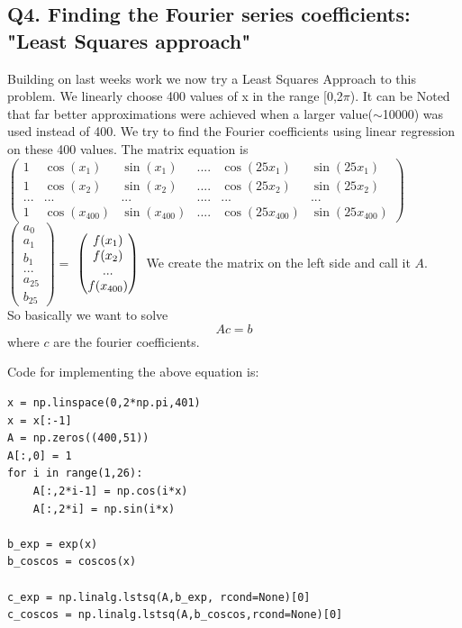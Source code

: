 \documentclass{article}
\begin{document}
\subsection*{Q4. Finding the Fourier series coefficients: "Least Squares approach"}
Building on last weeks work we now try a Least Squares Approach to this problem. We linearly choose 400 values of x in the range [0,2$\pi$). It can be Noted that far better approximations were achieved when a larger value($\sim$10000) was used instead of 400. 
We try to find the Fourier coefficients using linear regression on these 400 values. The matrix equation is\\[5mm]
\vspace{4mm}
$\begin{pmatrix} 
1 & \cos(x_1) & \sin(x_1) & .... & \cos(25x_1) & \sin(25x_1)\\
1 & \cos(x_2) & \sin(x_2) & .... & \cos(25x_2) & \sin(25x_2)\\
... & ... & ... & .... & ... & ... \\
1 & \cos(x_{400}) & \sin(x_{400}) & .... & \cos(25x_{400}) & \sin(25x_{400})
\end{pmatrix}
$$
\begin{pmatrix} 
a_0\\
a_1\\
b_1\\
...\\
a_{25}\\
b_{25}
\end{pmatrix}
=$
$
\begin{pmatrix} 
f(x_1)\\
f(x_2)\\
...\\
f(x_{400})
\end{pmatrix}\\
$
\vspace{4mm}
We create the matrix on the left side and call it \(A\).\\[-4mm]
So basically we want to solve\\
\begin{equation*}
 Ac=b
\end{equation*}
where \(c\) are the fourier coefficients.
\clearpage 

\hspace{-7mm} Code for implementing the above equation is:
\begin{lstlisting}
x = np.linspace(0,2*np.pi,401)
x = x[:-1]
A = np.zeros((400,51))
A[:,0] = 1
for i in range(1,26):
	A[:,2*i-1] = np.cos(i*x)
	A[:,2*i] = np.sin(i*x) 

b_exp = exp(x)  
b_coscos = coscos(x)

c_exp = np.linalg.lstsq(A,b_exp, rcond=None)[0]
c_coscos = np.linalg.lstsq(A,b_coscos,rcond=None)[0]

\end{lstlisting}
\end{document}
